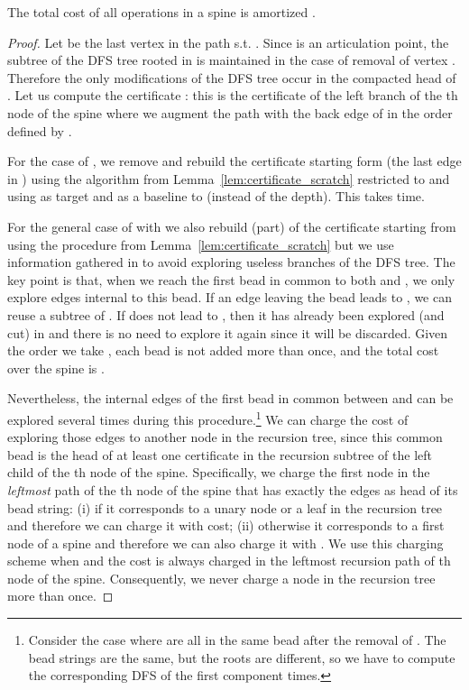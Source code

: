 \begin{lemma}
	\label{lem:promotebackedge}
	The total cost of all operations  in a
        spine is amortized .
\end{lemma}
\begin{proof}
	Let  be the last vertex in the path  s.t.
	. Since  is an articulation point, the subtree
        of the DFS tree rooted in  is maintained in the
	case of removal of vertex . Therefore the only modifications
	of the DFS tree occur in the compacted head  of .
Let us compute the certificate : this is the certificate
	of the left branch of the th node of the spine where we
	augment the path with the back edge  of
	 in the order defined by .

	For the case of , we remove  and rebuild the
	certificate starting form  (the last edge in )
	using the algorithm from Lemma~\ref{lem:certificate_scratch}
	restricted to  and using  as target and 
	as a baseline to  (instead of the depth). This takes
	 time.  

	For the general case of  with  we also rebuild
	(part) of the certificate starting from  using the
	procedure from Lemma~\ref{lem:certificate_scratch} but we use
	information gathered in  to avoid exploring useless
	branches of the DFS tree. The key point is that, when we reach
	the first bead in common to both  and
	, we only explore edges internal to this bead.
	If an edge  leaving the bead leads to , we can reuse
	a subtree of . If  does not lead to , then it
	has already been explored (and cut) in  and there is
	no need to explore it again since it will be discarded.
	Given the order we take , each bead is
	not added more than once, and the total cost over the
	spine is .

	Nevertheless, the internal edges  of the first bead in
	common between  and  can be explored
	several times during this procedure.\footnote{Consider the
	case where  are all in the same bead after
	the removal of . The bead strings are the same, but the
	roots  are different, so we have to compute
	the corresponding DFS of the first component  times.}
	We can charge the cost  of exploring those edges to
	another node in the recursion tree, since this common bead is
	the head of at least one certificate in the recursion subtree
	of the left child of the th node of the spine.
	Specifically, we charge the first node in the \emph{leftmost}
	path of the th node of the spine that has exactly the
	edges  as head of its bead string: (i) if 
	it corresponds to a unary node or a leaf in the recursion tree
	and therefore we can charge it with  cost; (ii)
	otherwise it corresponds to a first node of a spine and
	therefore we can also charge it with . We use this
	charging scheme when  and the cost is always charged
	in the leftmost recursion path of th node of the spine.
	Consequently, we never charge a node in the recursion tree more
	than once.  
\end{proof}


